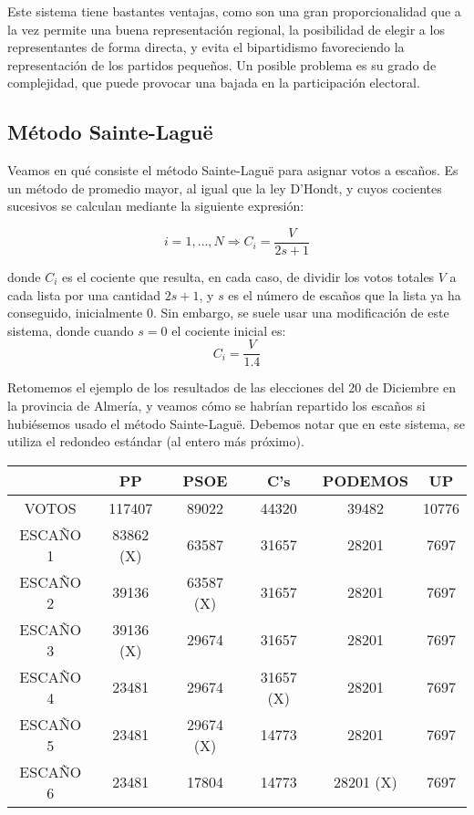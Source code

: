 \documentclass[11pt]{article}
\begin{document}
Este sistema tiene bastantes ventajas, como son una gran proporcionalidad que a la vez permite una buena representación regional, la posibilidad de elegir a los representantes de forma directa, y evita el bipartidismo favoreciendo la representación de los partidos pequeños. Un posible problema es su grado de complejidad, que puede provocar una bajada en la participación electoral.

\subsection{Método Sainte-Laguë}

Veamos en qué consiste el método Sainte-Laguë para asignar votos a escaños. Es un método de promedio mayor, al igual que la ley D'Hondt, y cuyos cocientes sucesivos se calculan mediante la siguiente expresión:

$$ i = 1,\ldots,N \Rightarrow C_i = \dfrac{V}{2s + 1}$$
	
	donde $C_i$ es el cociente que resulta, en cada caso, de dividir los votos totales $V$ a cada lista por una cantidad $2s + 1$, y $s$ es el número de escaños que la lista ya ha conseguido, inicialmente 0. Sin embargo, se suele usar una modificación de este sistema, donde cuando $s=0$ el cociente inicial es: $$ C_i = \frac{V}{1.4} $$

Retomemos el ejemplo de los resultados de las elecciones del 20 de Diciembre en la provincia de Almería, y veamos cómo se habrían repartido los escaños si hubiésemos usado el método Sainte-Laguë. Debemos notar que en este sistema, se utiliza el redondeo estándar (al entero más próximo).\\

\begin{center}
\begin{tabular}{|c|c|c|c|c|c|}
	\hline
	 & PP & PSOE & C's & PODEMOS & UP \\
	\hline
	VOTOS & 117407 & 89022 & 44320 & 39482 & 10776 \\
	\hline
	ESCAÑO 1 & 83862 (X) & 63587 & 31657 & 28201 & 7697 \\
	\hline
	ESCAÑO 2 & 39136 & 63587 (X) & 31657 & 28201 & 7697 \\
	\hline
	ESCAÑO 3 & 39136 (X) & 29674 & 31657 & 28201 & 7697 \\
	\hline
	ESCAÑO 4 & 23481 & 29674 & 31657 (X) & 28201 & 7697 \\
	\hline
	ESCAÑO 5 & 23481 & 29674 (X) & 14773 & 28201 & 7697 \\
	\hline
	ESCAÑO 6 & 23481 & 17804 & 14773 & 28201 (X) & 7697 \\
	\hline 
\end{tabular}
\end{center}
\end{document}
